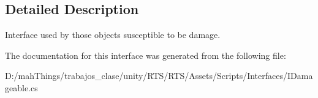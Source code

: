 \subsection{Detailed Description}
Interface used by those objects susceptible to be damage. 



The documentation for this interface was generated from the following file\+:\begin{DoxyCompactItemize}
\item 
D\+:/mah\+Things/trabajos\+\_\+clase/unity/\+R\+T\+S/\+R\+T\+S/\+Assets/\+Scripts/\+Interfaces/I\+Damageable.\+cs\end{DoxyCompactItemize}
